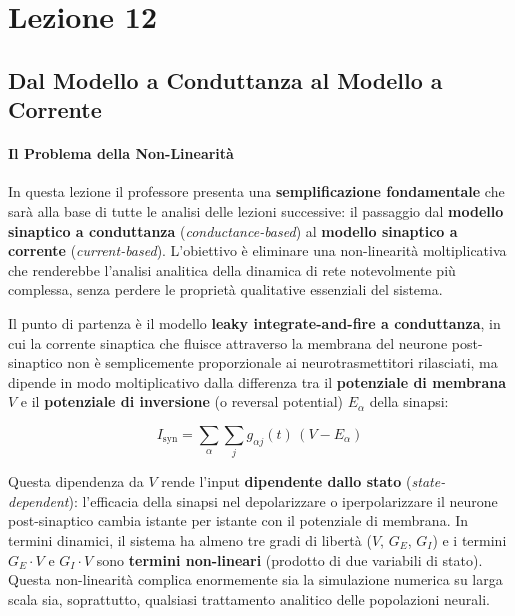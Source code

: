 \chapter{Lezione 12}

\section{Dal Modello a Conduttanza al Modello a Corrente}

\subsubsection{Il Problema della Non-Linearità}

In questa lezione il professore presenta una \textbf{semplificazione fondamentale} che sarà alla base di tutte le analisi delle lezioni successive: il passaggio dal \textbf{modello sinaptico a conduttanza} (\textit{conductance-based}) al \textbf{modello sinaptico a corrente} (\textit{current-based}). L'obiettivo è eliminare una non-linearità moltiplicativa che renderebbe l'analisi analitica della dinamica di rete notevolmente più complessa, senza perdere le proprietà qualitative essenziali del sistema.

Il punto di partenza è il modello \textbf{leaky integrate-and-fire a conduttanza}, in cui la corrente sinaptica che fluisce attraverso la membrana del neurone post-sinaptico non è semplicemente proporzionale ai neurotrasmettitori rilasciati, ma dipende in modo moltiplicativo dalla differenza tra il \textbf{potenziale di membrana} $V$ e il \textbf{potenziale di inversione} (o reversal potential) $E_\alpha$ della sinapsi:

\begin{equation}
I_{\text{syn}} = \sum_\alpha \sum_j g_{\alpha j}(t)\,(V - E_\alpha)
\end{equation}

Questa dipendenza da $V$ rende l'input \textbf{dipendente dallo stato} (\textit{state-dependent}): l'efficacia della sinapsi nel depolarizzare o iperpolarizzare il neurone post-sinaptico cambia istante per istante con il potenziale di membrana. In termini dinamici, il sistema ha almeno tre gradi di libertà ($V$, $G_E$, $G_I$) e i termini $G_E \cdot V$ e $G_I \cdot V$ sono \textbf{termini non-lineari} (prodotto di due variabili di stato). Questa non-linearità complica enormemente sia la simulazione numerica su larga scala sia, soprattutto, qualsiasi trattamento analitico delle popolazioni neurali.



